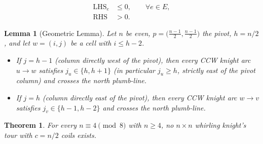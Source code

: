 \documentclass[10pt,a4paper]{amsart}
\newtheorem{theorem}{Theorem}
\newtheorem{lemma}{Lemma}
\newcommand{\LHS}{\mathrm{LHS}}
\newcommand{\RHS}{\mathrm{RHS}}
\begin{document}
\begin{align}
  \LHS_e &\le 0, \qquad \forall e\in E, \label{eq:LHS}\\
  \RHS &> 0. \label{eq:RHS}
\end{align}

\begin{lemma}[Geometric Lemma]\label{lem:G}
Let $n$ be even, $p=\bigl(\tfrac{n-1}{2},\tfrac{n-1}{2}\bigr)$ the
pivot, $h=n/2$, and let $w=(i,j)$ be a cell with $i\le h-2$.
\begin{itemize}
\item[(a)] If $j=h-1$ (column directly west of the pivot), then every
CCW knight arc $u\to w$ satisfies $j_u\in\{h,h+1\}$ (in particular
$j_u\ge h$, strictly east of the pivot column) and crosses the north
plumb-line.
\item[(b)] If $j=h$ (column directly east of the pivot), then every
CCW knight arc $w\to v$ satisfies $j_v\in\{h-1,h-2\}$ and crosses the
north plumb-line.
\end{itemize}
\end{lemma}

\begin{theorem}\label{thm:T2}
For every $n\equiv 4\pmod 8$ with $n\ge 4$, no $n\times n$ whirling
knight's tour with $c=n/2$ coils exists.
\end{theorem}
\end{document}
